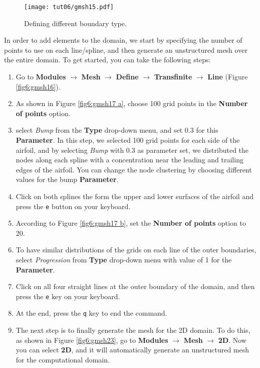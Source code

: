\begin{figure}[ht]
    \centering
    \texttt{[image: tut06/gmsh15.pdf]}
    \caption{Defining different boundary type.}
    \label{fig6:gmsh15}
\end{figure}
In order to add elements to the domain, we start by specifying the number of points to use on each line/spline, and then generate an unstructured mesh over the entire domain. To get started, you can take the following steps:
\begin{enumerate}[label=\arabic*)]
	\setcounter{enumi}{0}
	\item Go to \textbf{Modules} $\rightarrow$ \textbf{Mesh} $\rightarrow$ \textbf{Define} $\rightarrow$ \textbf{Transfinite} $\rightarrow$ \textbf{Line} (Figure \ref{fig6:gmsh16}).
	\item As shown in Figure \ref{fig6:gmsh17 a}, choose 100 grid points in the \textbf{Number of points} option.
	\item select \textit{Bump} from the \textbf{Type} drop-down menu, and set 0.3 for this \textbf{Parameter}. In this step, we selected 100 grid points for each side of the airfoil, and by selecting \textit{Bump} with 0.3 as parameter set, we distributed the nodes along each spline with a concentration near the leading and trailing edges of the airfoil. You can change the node clustering by choosing different values for the bump \textbf{Parameter}.
	\item Click on both splines the form the upper and lower surfaces of the airfoil and press the \texttt{e} button on your keyboard.
	\item According to Figure \ref{fig6:gmsh17 b}, set the \textbf{Number of points} option to 20.
	\item To have similar distributions of the grids on each line of the outer boundaries, select \textit{Progression} from \textbf{Type} drop-down menu with value of 1 for the \textbf{Parameter}.
	\item Click on all four straight lines at the outer boundary of the domain, and then press the \texttt{e} key on your keyboard.
	\item At the end, press the \texttt{q} key to end the command.
	\item The next step is to finally generate the mesh for the 2D domain. To do this, as shown in Figure \ref{fig6:gmsh23}, go to \textbf{Modules} $\rightarrow$ \textbf{Mesh} $\rightarrow$ \textbf{2D}. Now you can select \textbf{2D}, and it will  automatically generate an unstructured mesh for the computational domain.
\end{enumerate}
